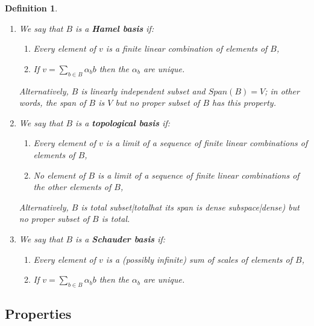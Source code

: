\documentclass[preprint, 5p, 10pt]{elsarticle}
\theoremstyle{plain}
\newtheorem{defn}{Definition}
\begin{document}
\begin{defn}
\label{basis}\hypertarget{basis}{}
\begin{enumerate}%
\item We say that $B$ is a \textbf{Hamel basis} if:

\begin{enumerate}%
\item Every element of $v$ is a finite linear combination of elements of $B$,
\item If $v = \sum_{b \in B} \alpha_b b$ then the $\alpha_b$ are unique.

\end{enumerate}
Alternatively, $B$ is linearly independent subset and $Span(B) = V$; in other words, the span of $B$ is $V$ but no proper subset of $B$ has this property.


\item We say that $B$ is a \textbf{topological basis} if:

\begin{enumerate}%
\item Every element of $v$ is a limit of a sequence of finite linear combinations of elements of $B$,
\item No element of $B$ is a limit of a sequence of finite linear combinations of the \emph{other} elements of $B$,

\end{enumerate}
Alternatively, $B$ is total subset|totalhat its span is dense subspace|dense) but no proper subset of $B$ is total.


\item We say that $B$ is a \textbf{Schauder basis} if:

\begin{enumerate}%
\item Every element of $v$ is a (possibly infinite) sum of scales of elements of $B$,
\item If $v = \sum_{b \in B} \alpha_b b$ then the $\alpha_b$ are unique.

\end{enumerate}


\end{enumerate}
\end{defn}
\subsection*{{Properties}}\label{properties_4}
\end{document}
